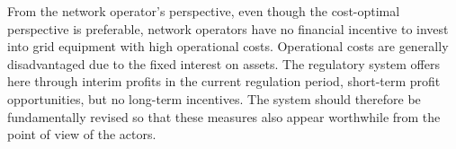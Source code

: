 From the network operator's perspective, even though the cost-optimal perspective is preferable, network operators have no financial incentive to invest into grid equipment with high operational costs. Operational costs are generally disadvantaged due to the fixed interest on assets. The regulatory system offers here through interim profits in the current regulation period, short-term profit opportunities, but no long-term incentives. The system should therefore be fundamentally revised so that
these measures also appear worthwhile from the point of view of the actors.~\cite{mona}